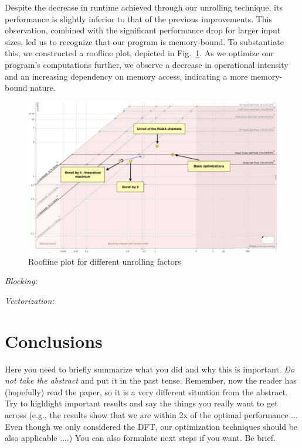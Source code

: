 \documentclass[letterpaper]{article}
\begin{document}
Despite the decrease in runtime achieved through our unrolling technique, its performance is slightly inferior to that of the previous improvements. This observation, combined with the significant performance drop for larger input sizes, led us to recognize that our program is memory-bound. To substantiate this, we constructed a roofline plot, depicted in Fig.~\ref{roofunroll}. As we optimize our program's computations further, we observe a decrease in operational intensity and an increasing dependency on memory access, indicating a more memory-bound nature.

\begin{figure}[htbp]
\centering
  \includegraphics[scale=0.25]{RooflineUnroll.pdf}
  \caption{Roofline plot for different unrolling factors
  \label{roofunroll}}
\end{figure}

\textit{Blocking:} 

\textit{Vectorization:} 

\section{Conclusions}

Here you need to briefly summarize what you did and why this is
important. {\em Do not take the abstract} and put it in the past
tense. Remember, now the reader has (hopefully) read the paper, so it
is a very different situation from the abstract. Try to highlight
important results and say the things you really want to get across
(e.g., the results show that we are within 2x of the optimal performance ...
Even though we only considered the DFT, our optimization
techniques should be also applicable ....) You can also formulate next
steps if you want. Be brief.
\end{document}
